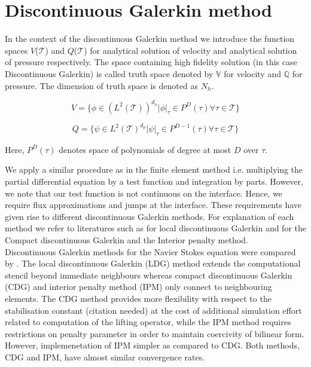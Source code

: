 \documentclass[a4paper,12pt]{book}
\begin{document}
\section{Discontinuous Galerkin method}

In the context of the discontinuous Galerkin method we introduce the function spaces $V$($\mathcal{T}$) and $Q$($\mathcal{T}$) for analytical solution of velocity and analytical solution of pressure respectively. The space containing high fidelity solution (in this case Discontinuous Galerkin) is called truth space denoted by $\mathbb{V}$ for velocity and $\mathbb{Q}$ for pressure. The dimension of truth space is denoted as $N_h$. 

\begin{equation} \label{velocity_test}
V = \lbrace \phi \in (L^2(\mathcal{T}))^{d_u}| \phi |_\tau \in P^D(\tau) \forall \tau \in \mathcal{T} \rbrace
\end{equation}

\begin{equation} \label{pressure_test}
Q = \lbrace \psi \in L^2(\mathcal{T})^{d_p}| \psi |_\tau \in P^{D-1}(\tau) \forall \tau \in \mathcal{T} \rbrace
\end{equation}

Here, $P^D(\tau)$ denotes space of polynomials of degree at most $D$ over $\tau$.

We apply a similar procedure as in the finite element method i.e. multiplying the partial differential equation by a test function and integration by parts. However, we note that our test function is not continuous on the interface. Hence, we require flux approximations and jumps at the interface. These requirements have given rise to different discontinuous Galerkin methods. For explanation of each method we refer to literatures such as \cite{persson} for local discontinuous Galerkin and \cite{Montlaur} for the Compact discontinuous Galerkin and the Interior penalty method. \\

Discontinuous Galerkin methods for the Navier Stokes equation were compared by \cite{Montlaur}. The local discontinuous Galerkin (LDG) method extends the computational stencil beyond immediate neighbours whereas compact discontinuous Galerkin (CDG) and interior penalty method (IPM) only connect to neighbouring elements. The CDG method provides more flexibility with respect to the stabilisation constant (citation needed) at the cost of additional simulation effort related to computation of the lifting operator, while the IPM method requires restrictions on penalty parameter in order to maintain coercivity of bilinear form. However, implemenetation of IPM simpler as compared to CDG. Both methods, CDG and IPM, have almost similar convergence rates. 
\end{document}
